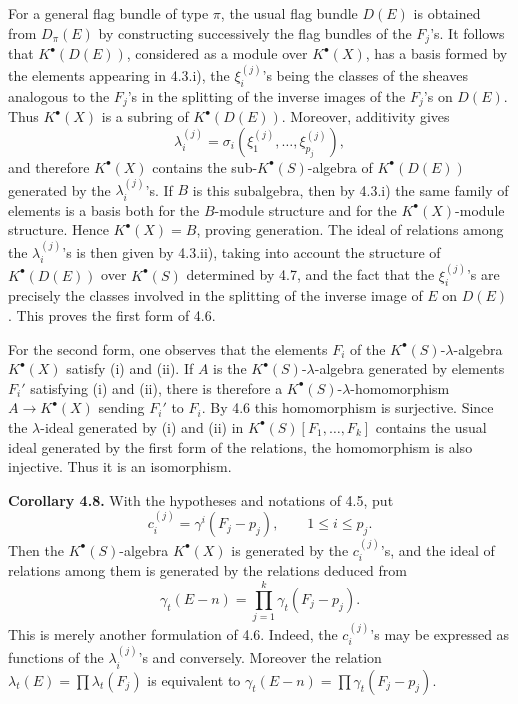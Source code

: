 \documentclass[11pt]{article}
\begin{document}
For a general flag bundle of type \(\pi\), the usual flag bundle \(D(E)\) is obtained from \(D_\pi(E)\) by constructing successively the flag bundles of the \(F_j\)'s. It follows that \(K^\bullet(D(E))\), considered as a module over \(K^\bullet(X)\), has a basis formed by the elements appearing in 4.3.i), the \(\xi_i^{(j)}\)'s being the classes of the sheaves analogous to the \(F_j\)'s in the splitting of the inverse images of the \(F_j\)'s on \(D(E)\). Thus \(K^\bullet(X)\) is a subring of \(K^\bullet(D(E))\). Moreover, additivity gives
\[
  \lambda_i^{(j)}=\sigma_i(\xi_1^{(j)},\ldots,\xi_{p_j}^{(j)}),
\]
and therefore \(K^\bullet(X)\) contains the sub-\(K^\bullet(S)\)-algebra of \(K^\bullet(D(E))\) generated by the \(\lambda_i^{(j)}\)'s. If \(B\) is this subalgebra, then by 4.3.i) the same family of elements is a basis both for the \(B\)-module structure and for the \(K^\bullet(X)\)-module structure. Hence \(K^\bullet(X)=B\), proving generation. The ideal of relations among the \(\lambda_i^{(j)}\)'s is then given by 4.3.ii), taking into account the structure of \(K^\bullet(D(E))\) over \(K^\bullet(S)\) determined by 4.7, and the fact that the \(\xi_i^{(j)}\)'s are precisely the classes involved in the splitting of the inverse image of \(E\) on \(D(E)\). This proves the first form of 4.6.

For the second form, one observes that the elements \(F_i\) of the \(K^\bullet(S)\)-\(\lambda\)-algebra \(K^\bullet(X)\) satisfy (i) and (ii). If \(A\) is the \(K^\bullet(S)\)-\(\lambda\)-algebra generated by elements \(F_i'\) satisfying (i) and (ii), there is therefore a \(K^\bullet(S)\)-\(\lambda\)-homomorphism \(A\to K^\bullet(X)\) sending \(F_i'\) to \(F_i\). By 4.6 this homomorphism is surjective. Since the \(\lambda\)-ideal generated by (i) and (ii) in \(K^\bullet(S)[F_1,\ldots,F_k]\) contains the usual ideal generated by the first form of the relations, the homomorphism is also injective. Thus it is an isomorphism.

\textbf{Corollary 4.8.} With the hypotheses and notations of 4.5, put
\[
  c_i^{(j)}=\gamma^i(F_j-p_j),
  \qquad 1\leq i\leq p_j.
\]
Then the \(K^\bullet(S)\)-algebra \(K^\bullet(X)\) is generated by the \(c_i^{(j)}\)'s, and the ideal of relations among them is generated by the relations deduced from
\[
  \gamma_t(E-n)=\prod_{j=1}^{k}\gamma_t(F_j-p_j).
\]
This is merely another formulation of 4.6. Indeed, the \(c_i^{(j)}\)'s may be expressed as functions of the \(\lambda_i^{(j)}\)'s and conversely. Moreover the relation \(\lambda_t(E)=\prod\lambda_t(F_j)\) is equivalent to \(\gamma_t(E-n)=\prod\gamma_t(F_j-p_j)\).
\end{document}
